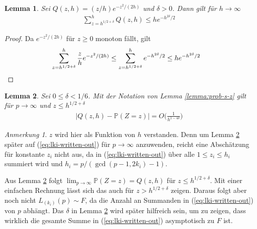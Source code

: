 \documentclass[a4paper, 11pt, ngerman]{article}
\renewcommand{\P}{\mathbb{P}}
\theoremstyle{definition}
\theoremstyle{plain}
\newtheorem{lemma}{Lemma}
\theoremstyle{remark}
\newtheorem*{remark*}{Anmerkung}
\begin{document}
\begin{lemma}
    Sei $Q(z, h) = (z/h)e^{-z^2/(2h)}$ und $\delta > 0$. Dann gilt für $h \to \infty$
    \begin{align*}
        \sum_{z = h^{1/2 + \delta}}^h Q(z, h) \le he^{-h^{2\delta}/2}
    \end{align*}

    \label{lemma:q-large-z-asymp}
\end{lemma}

\begin{proof}
    Da $e^{-z^2/(2h)}$ für $z \ge 0$ monoton fällt, gilt
    \begin{align*}
         & \sum_{z = h^{1/2 + \delta}}^h \frac z h e^{-z^2/(2h)}
        \le \sum_{z = h^{1/2 + \delta}}^h e^{-h^{2\delta}/2}
        \le he^{-h^{2\delta}/2} \qedhere
    \end{align*}
\end{proof}

\begin{lemma}
    Sei $0 \le \delta < 1/6$. Mit der Notation von Lemma \ref{lemma:prob-s-z} gilt für $p \to \infty$ und $z \le h^{1/2 + \delta}$
    \begin{align*}
        |Q(z, h) - \P(Z = z)| = O \bigg ( \frac 1 {h^{1 - 4\delta}} \bigg )
    \end{align*}

    \label{lemma:prob-s-z-asmyp}
\end{lemma}

\begin{remark*}
    $z$ wird hier als Funktion von $h$ verstanden. Denn um Lemma \ref{lemma:prob-s-z-asmyp} später auf (\ref{eq:lki-written-out}) für $p \to \infty$ anzuwenden, reicht eine Abschätzung für konstante $z_i$ nicht aus, da in (\ref{eq:lki-written-out}) über alle $1 \le z_i \le h_i$ summiert wird und $h_i = p/(\gcd(p - 1, 2k_i) - 1)$.

    Aus Lemma \ref{lemma:prob-s-z-asmyp} folgt $\lim_{p \to \infty} \P(Z = z) = Q(z, h)$ für $z \le h^{1/2 + \delta}$. Mit einer einfachen Rechnung lässt sich das auch für $z > h^{1/2 +\delta}$ zeigen. Daraus folgt aber noch nicht $L_{(k_i)}(p) \sim F$, da die Anzahl an Summanden in (\ref{eq:lki-written-out}) von $p$ abhängt. Das $\delta$ in Lemma \ref{lemma:prob-s-z-asmyp} wird später hilfreich sein, um zu zeigen, dass wirklich die gesamte Summe in (\ref{eq:lki-written-out}) asymptotisch zu $F$ ist.
\end{remark*}
\end{document}
